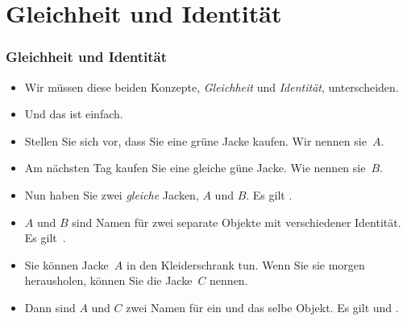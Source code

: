 \documentclass[aspectratio=169,mathserif,notheorems]{beamer}%
\begin{document}
\section{Gleichheit und Identität}%
%
\begin{frame}%
\frametitle{Gleichheit und Identität}%
\begin{itemize}%
\item Wir müssen diese beiden Konzepte, \emph{Gleichheit} und \emph{Identität}, unterscheiden.%
\item<2-> Und das ist einfach.%
%
\item<3-> Stellen Sie sich vor, dass Sie eine grüne Jacke kaufen. Wir nennen sie~$A$.%
%
\item<4-> Am nächsten Tag kaufen Sie eine gleiche güne Jacke. Wie nennen sie~$B$.%
%
\item<5-> Nun haben Sie zwei \emph{gleiche} Jacken, $A$ und $B$. Es gilt .%
%
\item<6-> $A$ und $B$ sind Namen für zwei separate Objekte mit verschiedener Identität. Es gilt~.%
%
\item<7-> Sie können Jacke~$A$ in den Kleiderschrank tun. Wenn Sie sie morgen herausholen, können Sie die Jacke~$C$ nennen.%
%
\item<8-> Dann sind $A$ und $C$ zwei Namen für ein und das selbe Objekt. Es gilt  und .%
%
\end{itemize}%
\end{frame}%
%
\end{document}
